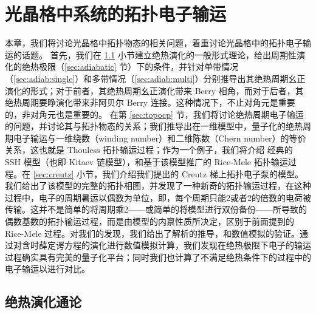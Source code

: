 \chapter{光晶格中系统的拓扑电子输运} \label{chap:chargepump}

本章，我们将讨论光晶格中拓扑物态的相关问题，着重讨论光晶格中的拓扑电子输运的话题。
首先，我们在 \ref{sec:adiabevolgeneral} 小节建立绝热演化的一般形式理论，给出周期性演化的绝热极限（\ref{sec:adiabatic} 节）下的条件，并针对单带情况（\ref{sec:adiab:single}）和多带情况（\ref{sec:adiab:multi}）分别推导出其绝热周期幺正演化的形式；对于前者，其绝热周期幺正演化带来 Berry 相角，而对于后者，其绝热周期要睁演化带来非阿贝尔 Berry 连接。这种情况下，不止对角元是重要的，非对角元也是重要的。
在第 \ref{sec:topocp} 节，我们将讨论绝热周期电子输运的问题，并讨论其与拓扑物态的关系；我们推导出在一维模型中，量子化的绝热周期电子输运与一维绕数（winding number）和二维陈数（Chern number）的等价关系，这也就是 Thouless 拓扑输运过程\cite{thouless1983}；作为一个例子，我们将介绍 经典的 SSH 模型\cite{ssh1979}（也即 Kitaev 链模型\cite{kitaev2001}），和基于该模型推广的 Rice-Mele 拓扑输运过程\cite{ricemele1982}。在 \ref{sec:creutz} 小节，我们介绍我们提出的 Creutz 梯\cite{creutz1999}上拓扑电子泵的模型\cite{creutz}。我们给出了该模型的完整的拓扑相图，并发现了一种新奇的拓扑输运过程，在这种过程中，电子的周期暑运以偶数为单位，即，每个周期只能2或者2的倍数的电荷被传输。这并不是简单的将周期乘2——或简单的将模型进行双份备份——所导致的偶数基数的拓扑输运过程，而是由模型的内禀性质所决定，区别于前面提到的 Rice-Mele 过程。对我们的发现，我们给出了解析的推导，和数值模拟的验证。通过对含时薛定谔方程的演化进行数值模拟计算，我们发现在绝热极限下电子的输运过程确实具有完美的量子化平台；同时我们也计算了不满足绝热条件下的过程中的电子输运以进行对比。





\section{绝热演化通论}\label{sec:adiabevolgeneral}

